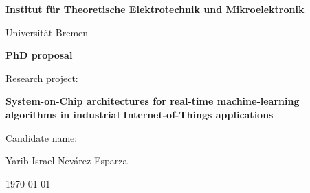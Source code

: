 
\begin{center}
\textbf{Institut f\"ur Theoretische Elektrotechnik und Mikroelektronik}
\vspace{5mm}

{\large Universit\"at Bremen}
\vspace{20mm}

\textbf{\Large PhD proposal}
\vspace{40mm}





Research project:

\textbf{System-on-Chip architectures for real-time machine-learning algorithms in industrial Internet-of-Things applications}

\vspace{40mm}

Candidate name:

Yarib Israel Nev\'arez Esparza
\vspace{20mm}

\today

\end{center}


\pagebreak